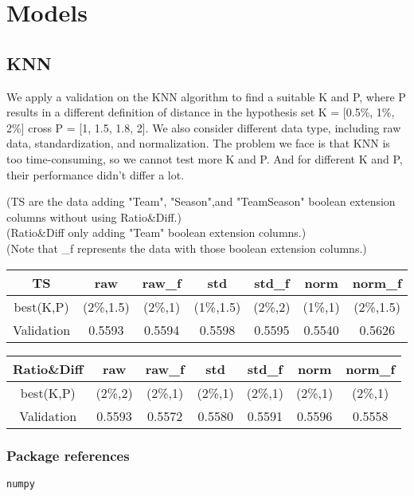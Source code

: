 \section{Models}
\subsection*{KNN}

\quad We apply a validation on the KNN algorithm to find a suitable K and P, where P results in a different definition of distance in the hypothesis set K = [0.5\%, 1\%, 2\%] cross P = [1, 1.5, 1.8, 2]. We also consider different data type, including raw data, standardization, and normalization. The problem we face is that KNN is too time-consuming, so we cannot test more K and P. And for different K and P, their performance didn't differ a lot.

\noindent
(TS are the data adding "Team", "Season",and "TeamSeason" boolean extension columns without using Ratio\&Diff.) \\
(Ratio\&Diff only adding "Team" boolean extension columns.) \\
(Note that \_f represents the data with those boolean extension columns.)

\vspace{6pt}

\begin{tabular}{|c|c|c|c|c|c|c|}
    \hline
    TS & raw & raw\_f & std & std\_f & norm & norm\_f \\\hline
    best(K,P) & (2\%,1.5) & (2\%,1) & (1\%,1.5) & (2\%,2) & (1\%,1) & (2\%,1.5)\\\hline
    Validation & 0.5593 & 0.5594 & 0.5598 & 0.5595 & 0.5540 & 0.5626\\\hline
\end{tabular}

\vspace{12pt}

\begin{tabular}{|c|c|c|c|c|c|c|}
    \hline
    Ratio\&Diff & raw & raw\_f & std & std\_f & norm & norm\_f \\\hline
    best(K,P) & (2\%,2) & (2\%,1) & (2\%,1) & (2\%,1) & (2\%,1) & (2\%,1)\\\hline
    Validation & 0.5593 & 0.5572 & 0.5580 & 0.5591 & 0.5596 & 0.5558\\\hline
\end{tabular}

\subsubsection*{Package references}
\begin{lstlisting}[language=Python]
numpy
\end{lstlisting}